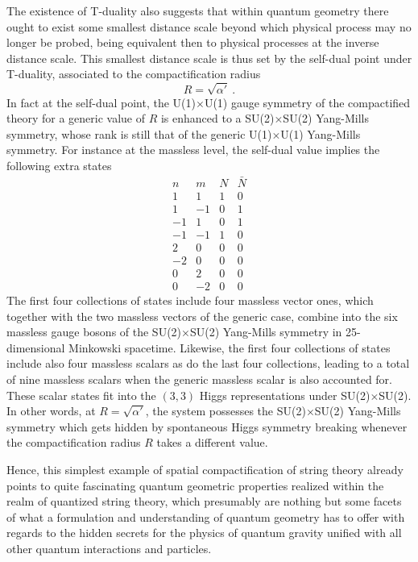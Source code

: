 \documentclass[a4paper,11pt]{article}
\begin{document}
The existence of T-duality also suggests that within quantum geometry
there ought to exist some smallest distance scale beyond which physical
process may no longer be probed, being equivalent then to physical processes
at the inverse distance scale. This smallest distance scale is thus set by 
the self-dual point under T-duality, associated to the compactification radius
\begin{equation}
R=\sqrt{\alpha'}\ .
\end{equation}
In fact at the self-dual point, the U(1)$\times$U(1) gauge symmetry of the
com\-pac\-ti\-fied theory for a generic value of $R$ is enhanced to a 
SU(2)$\times$SU(2) Yang-Mills symmetry, whose rank is still that of the
generic U(1)$\times$U(1) Yang-Mills symmetry. For instance at the massless 
level, the self-dual value implies the following extra states
\begin{equation}
\begin{array}{r|r|r|r}
n & m & N & \bar{N} \\
\hline
1 & 1 & 1 & 0 \\
1 & -1 & 0 & 1 \\
-1 & 1 & 0 & 1 \\
-1 & -1 & 1 & 0 \\
2 & 0 & 0 & 0 \\
-2 & 0 & 0 & 0 \\
0 & 2 & 0 & 0 \\
0 & -2 & 0 & 0 
\end{array}
\end{equation}
The first four collections of states include four massless vector ones,
which together with the two massless vectors of the generic case, combine into
the six massless gauge bosons of the SU(2)$\times$SU(2) Yang-Mills symmetry
in 25-dimensional Minkowski spacetime. Likewise, the first four collections
of states include also four massless scalars as do the last four collections,
leading to a total of nine massless scalars when the generic massless scalar
is also accounted for. These scalar states fit into the $(3,3)$ Higgs
representations under SU(2)$\times$SU(2). In other words, at 
$R=\sqrt{\alpha'}$, the system possesses the SU(2)$\times$SU(2) Yang-Mills 
symmetry which gets hidden by spontaneous Higgs symmetry breaking whenever 
the compactification radius $R$ takes a different value.\cite{Pol,GSW}

Hence, this simplest example of spatial compactification of string
theory already points to quite fascinating quantum geometric properties
realized within the realm of quantized string theory, which presumably
are nothing but some facets of what a formulation and understanding of 
quantum geometry has to offer with regards to the hidden secrets for
the physics of quantum gravity unified with all other quantum interactions 
and particles.
\end{document}
